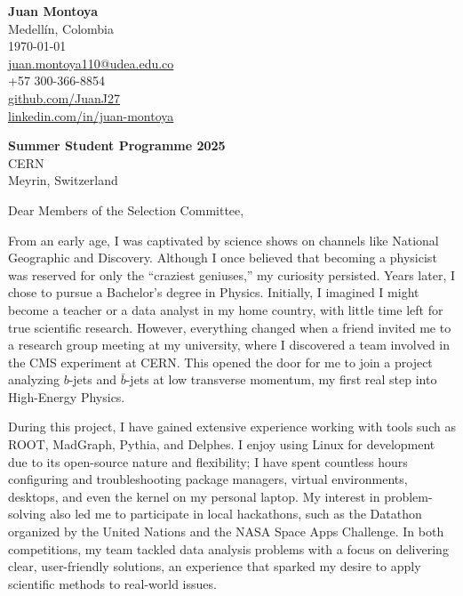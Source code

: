 \documentclass[11pt]{report}
\begin{document}
\begin{titlepage}

    \begin{minipage}[t]{0.95\textwidth}
        \hfill
        \raggedleft
        \textbf{ Juan Montoya} \\
        Medellín, Colombia \\
        \today\\
        \href{mailto:juan.montoya110@udea.edu.co}{juan.montoya110@udea.edu.co} \\
        +57 300-366-8854 \\
        \href{https://github.com/JuanJ27}{github.com/JuanJ27} \\
        \href{https://www.linkedin.com/in/juan-montoya-68262071/}{linkedin.com/in/juan-montoya}
    \end{minipage}

\raggedright \textbf{Summer Student Programme 2025} \\ CERN \\ Meyrin, Switzerland

\vspace{0.7em}

\raggedright Dear Members of the Selection Committee,\\

\vspace{0.4em}

From an early age, I was captivated by science shows on channels like National Geographic and Discovery. Although I once believed that becoming a physicist was reserved for only the “craziest geniuses,” my curiosity persisted. Years later, I chose to pursue a Bachelor’s degree in Physics. Initially, I imagined I might become a teacher or a data analyst in my home country, with little time left for true scientific research. However, everything changed when a friend invited me to a research group meeting at my university, where I discovered a team involved in the CMS experiment at CERN. This opened the door for me to join a project analyzing $b$-jets and $ \bar b$-jets at low transverse momentum, my first real step into High-Energy Physics.

\vspace{0.7em}

During this project, I have gained extensive experience working with tools such as ROOT, MadGraph, Pythia, and Delphes. I enjoy using Linux for development due to its open-source nature and flexibility; I have spent countless hours configuring and troubleshooting package managers, virtual environments, desktops, and even the kernel on my personal laptop. My interest in problem-solving also led me to participate in local hackathons, such as the Datathon organized by the United Nations and the NASA Space Apps Challenge. In both competitions, my team tackled data analysis problems with a focus on delivering clear, user-friendly solutions, an experience that sparked my desire to apply scientific methods to real-world issues.


\end{titlepage}
\end{document}

